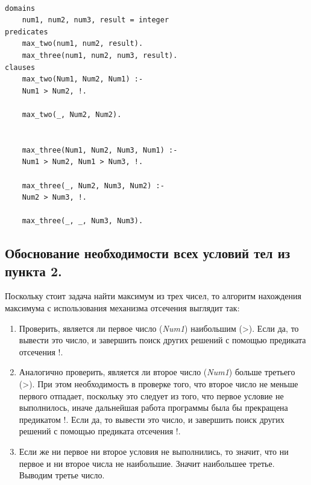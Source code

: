 \documentclass[a4paper,12pt]{article}
\begin{document}
	

	\begin{verbatim}

domains
	num1, num2, num3, result = integer
predicates
	max_two(num1, num2, result).
	max_three(num1, num2, num3, result).
clauses
	max_two(Num1, Num2, Num1) :-
	Num1 > Num2, !.
	
	max_two(_, Num2, Num2).
	
	
	max_three(Num1, Num2, Num3, Num1) :-
	Num1 > Num2, Num1 > Num3, !.
	
	max_three(_, Num2, Num3, Num2) :-
	Num2 > Num3, !.
	
	max_three(_, _, Num3, Num3).

	\end{verbatim}

	

	\subsection*{Обоснование необходимости всех условий тел из пункта 2.}

	

	Поскольку стоит задача найти максимум из трех чисел, то алгоритм нахождения максимума с использования механизма отсечения выглядит так:

	

	\begin{enumerate}

		\item Проверить, является ли первое число (\textit{Num1}) наибольшим (>). Если да, то вывести это число, и завершить поиск других решений с помощью предиката отсечения !.

		\item Аналогично проверить, является ли второе число (\textit{Num1}) больше третьего (>). При этом необходимость в проверке того, что второе число не меньше первого отпадает, поскольку это следует из того, что первое условие не выполнилось, иначе дальнейшая работа программы была бы прекращена предикатом !. Если да, то вывести это число, и завершить поиск других решений с помощью предиката отсечения !.

		\item Если же ни первое ни второе условия не выполнились, то значит, что ни первое и ни второе числа не наибольшие. Значит наибольшее третье. Выводим третье число.

	\end{enumerate}

	
\end{document}
